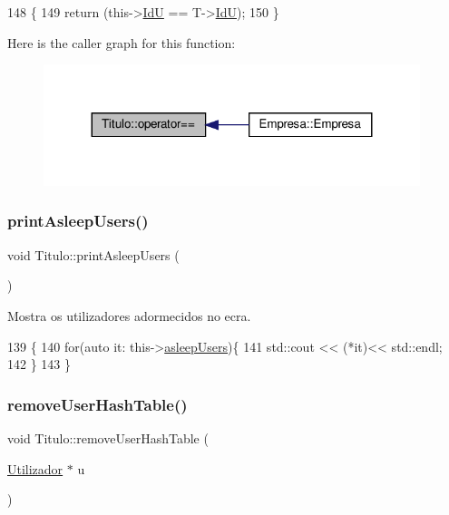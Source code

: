 \begin{DoxyCode}
148                                          \{
149     \textcolor{keywordflow}{return} (this->\hyperlink{classTitulo_aff7d1cc9accbc0f49c05cdc97c66844c}{IdU} == T->\hyperlink{classTitulo_aff7d1cc9accbc0f49c05cdc97c66844c}{IdU});
150  \}
\end{DoxyCode}
Here is the caller graph for this function\+:
\nopagebreak
\begin{figure}[H]
\begin{center}
\leavevmode
\includegraphics[width=311pt]{classTitulo_ac0622a3b256910ac87ee900a9be014b6_icgraph}
\end{center}
\end{figure}
\mbox{\label{classTitulo_ab14d7a11d5b91dec67fb115cfa83d860}} 
\subsubsection{\texorpdfstring{print\+Asleep\+Users()}{printAsleepUsers()}}
{\footnotesize\ttfamily void Titulo\+::print\+Asleep\+Users (\begin{DoxyParamCaption}{ }\end{DoxyParamCaption})}



Mostra os utilizadores adormecidos no ecra. 


\begin{DoxyCode}
139                              \{
140     \textcolor{keywordflow}{for}(\textcolor{keyword}{auto} it: this->\hyperlink{classTitulo_a84e7b9dc58fbba5f048a57a0878a43e8}{asleepUsers})\{
141         std::cout << (*it)<< std::endl;
142     \}
143 \}
\end{DoxyCode}
\mbox{\label{classTitulo_a66ee2ff7b95cf280a667dc87477a0ae1}} 
\subsubsection{\texorpdfstring{remove\+User\+Hash\+Table()}{removeUserHashTable()}}
{\footnotesize\ttfamily void Titulo\+::remove\+User\+Hash\+Table (\begin{DoxyParamCaption}\item[{\hyperlink{classUtilizador}{Utilizador} $\ast$}]{u }\end{DoxyParamCaption})}



